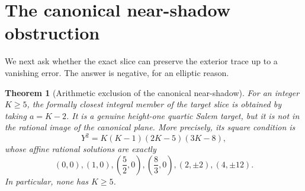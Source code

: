 \documentclass[11pt,reqno]{amsart}
\newtheorem{theorem}{Theorem}[section]
\theoremstyle{definition}
\theoremstyle{remark}
\begin{document}
\section{The canonical near-shadow obstruction}

We next ask whether the exact slice can preserve the exterior trace up to a
vanishing error.  The answer is negative, for an elliptic reason.

\begin{theorem}[Arithmetic exclusion of the canonical near-shadow]
\label{thm:nearshadow}
For an integer $K\geq5$, the formally closest integral member of the target
slice is obtained by taking $a=K-2$.  It is a genuine height-one quartic
Salem target, but it is not in the rational image of the canonical plane.
More precisely, its square condition is
\begin{equation}\label{eq:nearquartic}
 Y^2=K(K-1)(2K-5)(3K-8),
\end{equation}
whose affine rational solutions are exactly
\[
 (0,0),(1,0),\left(\frac52,0\right),
 \left(\frac83,0\right),(2,\pm2),(4,\pm12).
\]
In particular, none has $K\geq5$.
\end{theorem}
\end{document}
